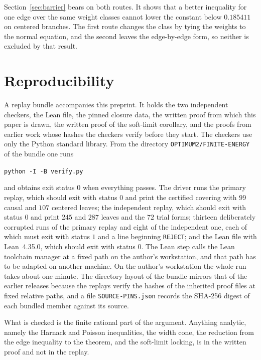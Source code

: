 \documentclass[10pt]{article}
\theoremstyle{remark}
\begin{document}
Section~\ref{sec:barrier} bears on both routes. It shows that a better inequality for one edge over the same weight classes cannot lower the constant below $0.185411$ on centered branches. The first route changes the class by tying the weights to the normal equation, and the second leaves the edge-by-edge form, so neither is excluded by that result.

\section{Reproducibility}\label{sec:repro}

A replay bundle accompanies this preprint. It holds the two independent checkers, the Lean file, the pinned closure data, the written proof from which this paper is drawn, the written proof of the soft-limit corollary, and the proofs from earlier work whose hashes the checkers verify before they start. The checkers use only the Python standard library. From the directory \texttt{OPTIMUM2/FINITE-ENERGY} of the bundle one runs
\begin{center}\texttt{python -I -B verify.py}\end{center}
and obtains exit status $0$ when everything passes. The driver runs the primary replay, which should exit with status $0$ and print the certified covering with $99$ causal and $107$ centered leaves; the independent replay, which should exit with status $0$ and print $245$ and $287$ leaves and the $72$ trial forms; thirteen deliberately corrupted runs of the primary replay and eight of the independent one, each of which must exit with status $1$ and a line beginning \texttt{REJECT}; and the Lean file with Lean~4.35.0, which should exit with status $0$. The Lean step calls the Lean toolchain manager at a fixed path on the author's workstation, and that path has to be adapted on another machine. On the author's workstation the whole run takes about one minute. The directory layout of the bundle mirrors that of the earlier releases because the replays verify the hashes of the inherited proof files at fixed relative paths, and a file \texttt{SOURCE-PINS.json} records the SHA-256 digest of each bundled member against its source.

What is checked is the finite rational part of the argument. Anything analytic, namely the Harnack and Poisson inequalities, the width cone, the reduction from the edge inequality to the theorem, and the soft-limit locking, is in the written proof and not in the replay.
\end{document}
